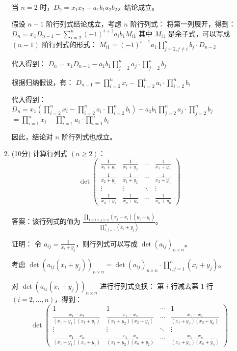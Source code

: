 \documentclass[a4paper,12pt]{article}
\begin{document}
\begin{enumerate}[leftmargin=*]
当 $n=2$ 时，$D_2 = x_1x_2 - a_1b_1a_2b_2$，结论成立。

假设 $n-1$ 阶行列式结论成立，考虑 $n$ 阶行列式：
将第一列展开，得到：
$D_n = x_1D_{n-1} - \sum_{i=2}^n (-1)^{i+1} a_ib_1 M_{i1}$
其中 $M_{i1}$ 是余子式，可以写成 $(n-1)$ 阶行列式的形式：
$M_{i1} = (-1)^{i+1} a_1 \prod_{j=2,j\neq i}^n b_j \cdot D_{n-2}$

代入得到：
$D_n = x_1D_{n-1} - a_1b_1 \prod_{j=2}^n a_j \cdot \prod_{j=2}^n b_j$

根据归纳假设，有：
$D_{n-1} = \prod_{i=2}^n x_i - \prod_{i=2}^n a_i \cdot \prod_{i=2}^n b_i$

代入得到：
$D_n = x_1(\prod_{i=2}^n x_i - \prod_{i=2}^n a_i \cdot \prod_{i=2}^n b_i) - a_1b_1 \prod_{j=2}^n a_j \cdot \prod_{j=2}^n b_j$
$    = \prod_{i=1}^n x_i - \prod_{i=1}^n a_i \cdot \prod_{i=1}^n b_i$

因此，结论对 $n$ 阶行列式也成立。

\item (10分) 计算行列式 $(n \geq 2)$：
\[
\det\begin{pmatrix}
\frac{1}{x_1+y_1} & \frac{1}{x_1+y_2} & \cdots & \frac{1}{x_1+y_n} \\
\frac{1}{x_2+y_1} & \frac{1}{x_2+y_2} & \cdots & \frac{1}{x_2+y_n} \\
\vdots & \vdots & \ddots & \vdots \\
\frac{1}{x_n+y_1} & \frac{1}{x_n+y_2} & \cdots & \frac{1}{x_n+y_n}
\end{pmatrix}
\]

答案：该行列式的值为 $\frac{\prod_{1\leq i<j\leq n}(x_j-x_i)(y_j-y_i)}{\prod_{i,j=1}^n(x_i+y_j)}$。

证明：
令 $a_{ij} = \frac{1}{x_i+y_j}$，则行列式可以写成 $\det(a_{ij})_{n\times n}$。

考虑 $\det(a_{ij}(x_i+y_j))_{n\times n} = \det(a_{ij})_{n\times n} \cdot \prod_{i,j=1}^n(x_i+y_j)$。

对 $\det(a_{ij}(x_i+y_j))_{n\times n}$ 进行行列式变换：
第 $i$ 行减去第 1 行 $(i=2,\ldots,n)$，得到：
\[
\det\begin{pmatrix}
1 & 1 & \cdots & 1 \\
\frac{x_1-x_2}{(x_1+y_1)(x_2+y_1)} & \frac{x_1-x_2}{(x_1+y_2)(x_2+y_2)} & \cdots & \frac{x_1-x_2}{(x_1+y_n)(x_2+y_n)} \\
\vdots & \vdots & \ddots & \vdots \\
\frac{x_1-x_n}{(x_1+y_1)(x_n+y_1)} & \frac{x_1-x_n}{(x_1+y_2)(x_n+y_2)} & \cdots & \frac{x_1-x_n}{(x_1+y_n)(x_n+y_n)}
\end{pmatrix}
\]


\end{enumerate}
\end{document}
